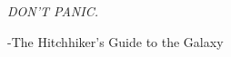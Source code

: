 \documentclass[tcc]{subfile}
\begin{document}
\begin{epigrafe}
    \vspace*{\fill}
	\begin{flushright}
        \epigraph{\huge \textsf{\em DON'T PANIC.}}{-The Hitchhiker's Guide to the Galaxy}
	\end{flushright}
\end{epigrafe}
\end{document}
